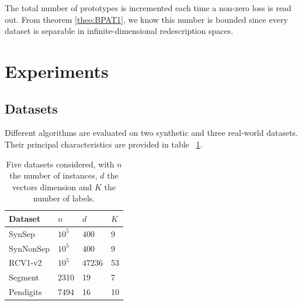 \documentclass[preprint,12pt,authoryear]{elsarticle}
\begin{document}
The total number of prototypes is incremented each time a non-zero loss is read out. From theorem \ref{theo:BPAT1}, we know this number is bounded since every dataset is separable in infinite-dimensional redescription spaces. 

  



\section{Experiments}
\subsection{Datasets}
\label{subsec:BPAE}

Different algorithms are evaluated on two synthetic and three real-world datasets.  Their principal characteristics are provided in table ~\ref{table:mce}.

\begin{table}[h]
	\caption{Five datasets considered, with $n$ the number of instances, $d$ the vectors dimension and $K$ the number of labels.}
	\label{table:mce}
	\begin{center}
		\begin{tabular}{l l l l}
			{\bf Dataset}  & {\bf $n$} & {\bf $d$} & {\bf $K$}\\
			\hline
			SynSep & $10^5$ 	& 400 	& 9 \\
			
			SynNonSep & $10^5$ & 400 	& 9 \\
			
			RCV1-v2  & $10^5$ 	& 47236 	& 53 \\
			
			Segment & 2310	& 19	& 7	\\
			
			Pendigits 	& 7494	& 16	& 10	\\
		\end{tabular}
	\end{center}
\end{table}
\end{document}
